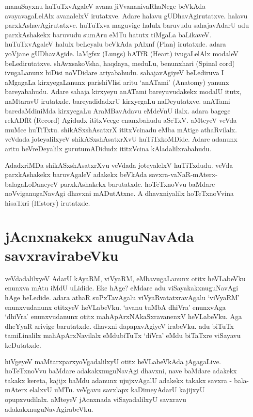 manuSayxnu huTuTxvAgaleV avana jiVvananivaRhaNege beVkAda avayavagaLelAlx avanalelxV irutatxve. Adare halavu gUDhavAgirutatxve. halavu parxkAshavAgirutatxve. huTuTxva maguvige halulx baruvudu sahajavAdarU adu parxkAshakekx baruvudu sumAru eMTu hatutx tiMgaLa baLikaveV. huTuTxvAgaleV halulx beLeyalu beVkAda pAlxnf {(\eng Plan)} irutatxde. adara yoVjane gUDhavAgide. laMgfsx  {(\eng Lungs)} hATfR {(\eng Heart)} ivugaLelAlx modaleV beLedirutatxve. shAvxsakoVsha, haqdaya, meduLu, benunxhari {(\eng Spinal cord)} ivugaLanunx  biDisi noVDidare ariyabahudu. sahajavAgiyeV beLediruva I aMgagaLa kirxyegaLanunx parishiVlisi aritu `anATami' {(\eng Anatomy)} yanunx bareyabahudu. Adare sahaja kirxyeyu anATami bareyuvudakekx  modalU itutx, naMtaravU irutatxde. bareyadidadxrU kirxyegaLu naDeyutatxve. anATami baredaMdiniMda kirxyegaLu AraMBavAdavu eMdeVnU ilalx. adara bagege rekADfR 
{\eng(Record)} Agidudx ititxVcege enanxbahudu aSeTxV. aMteyeV veVda muMce huTiTxtu. shikASxshAsatxrX ititxVcinadu eMba mAtige athaRvilalx. veVdada joteyalilxyeV shikASxshAsatxrXvU huTiTxkoMDide. Adare adanunx aritu beVreDeyalilx gurutumADidudx ititxVcina kAladalilxrabahudu.

AdadxriMDa shikASxshAsatxrXvu veVdada joteyalelxV huTiTxdudu. veVda parxkAshakekx  baruvAgaleV adakekx beVkAda savxra-vaNaR-mAterx-balagaLoDaneyeV parxkAshakekx barutatxde. hoTeTxnoVvu baMdare noVviganugaNavAgi dhavxni mADutAtxne. A dhavxniyalilx hoTeTxnoVvina hisaTxri {(\eng History)} irutatxde.

\section*{jAcnxnakekx anuguNavAda savxravirabeVku}

veVdadalilxyeV AdarU kAyaRM, viVyaRM, eMbavugaLanunx otitx heVLabeVku enunxva mAtu iMdU uLidide. Eke hAge? eMdare adu viSayakakxnuguNavAgi hAge beLedide. adara athaR suPxTavAgalu viVyaRvatatxravAgalu `viVyaRM' enunxvudanunx  otitxyeV heVLabeVku. `avanu tuMbA dhiVra' enunxvAga `dhiVra' enunxvudanunx otitx mahApArxNAkaSxravanenxV heVLabeVku. Aga dheYyaR arivige barutatxde. dhavxni dapapxvAgiyeV irabeVku. adu biTuTx tamiLinalilx mahApArxNavilalx eMdubiTuTx `diVra' eMdu biTaTxre viSayavu keDutatxde.

hiVgeyeV maMtarxparxyoVgadalilxyU otitx heVLabeVkAda jAgagaLive. hoTeTxnoVvu baMdare adakakxnuguNavAgi dhavxni, nave baMdare adakekx takakx kereta, kajijx  baMdu adanunx ujujxvAgalU adakekx takakx savxra - bala- mAterx elalxvU uMTu. veVgavu savxlapx kaDimeyAdarU kajijxyU opupxvudilalx. aMteyeV jAcnxnada viSayadalilxyU savxravu adakakxnuguNavAgirabeVku.


